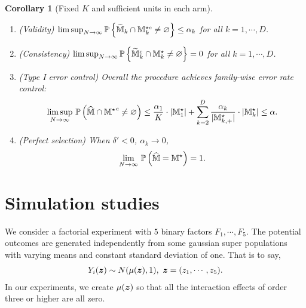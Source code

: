\documentclass[12pt]{article}
\newtheorem{corollary}{Corollary}
\begin{document}
{\begin{corollary}[Fixed $K$ and sufficient units in each arm]
\begin{enumerate}
    \item (Validity) $\lim\sup_{N\to\infty}{\mathbb{P}}\left\{\widetilde{{\mathbb{M}}}_{k}\cap{\mathbb{M}}^{\star c}_k\neq \varnothing\right\}\le \alpha_k$ for all $k=1,\cdots,D$.
    \item (Consistency) $\lim\sup_{N\to\infty}{\mathbb{P}}\left\{\widetilde{{\mathbb{M}}}_{k}^c\cap{\mathbb{M}}^{\star}_k\neq \varnothing\right\} = 0$ for all $k=1,\cdots,D$.
    \item (Type I error control) Overall the procedure achieves family-wise error rate control:
    \begin{align*}
    \underset{N\to\infty}{\lim\sup}~{\mathbb{P}}\left(\widehat{{\mathbb{M}}}\cap{{\mathbb{M}}^\star}^c\neq \varnothing\right)
    \le 
    \frac{\alpha_1}{K}\cdot|{\mathbb{M}}_1^\star| + \sum_{k=2}^D \frac{\alpha_k}{|{\mathbb{M}}^\star_{k,+}|}\cdot|{\mathbb{M}}^\star_k| \le \alpha.
    \end{align*}
    \item (Perfect selection) When $\delta'<0$, $\alpha_k\to0$, 
    \begin{align*}
    \underset{N\to\infty}{\lim}~{\mathbb{P}}\left(\widehat{{\mathbb{M}}} = {{\mathbb{M}}^\star}  \right)
     = 1.
    \end{align*}
\end{enumerate}

\end{corollary}
}








\section{Simulation studies}\label{sec:simulation}
We consider a factorial experiment with $5$ binary factors $F_1, \cdots, F_5$. The potential outcomes are generated independently from some gaussian super populations with varying means and constant standard deviation of one.  That is to say, 
\begin{align*}
    Y_i({{\boldsymbol{z}}}) \sim N(\mu({{\boldsymbol{z}}}), 1),~ {\boldsymbol{z}} = (z_1,\cdots, z_5).
\end{align*}
In our experiments, we create $\mu({\boldsymbol{z}})$ so that all the interaction effects of order three or higher are all zero. 
\end{document}
